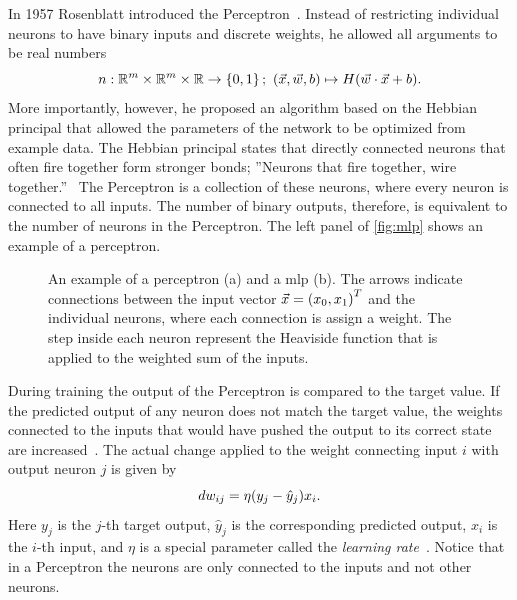 In 1957 Rosenblatt introduced the Perceptron~\cite{rosenblatt:1958}. Instead of restricting individual neurons to have binary inputs and discrete weights, he allowed all arguments to be real numbers
\begin{equation}\label{eq:neuron-rosenblatt}
n: {\mathbb{R}}^m\times {\mathbb{R}}^m\times {\mathbb{R}} \to \left\{0,1\right\};\ {\left( \vec{x}, \vec{w}, b \right)}\mapsto H{\left( \vec{w}\cdot\vec{x} + b \right)}.
\end{equation}
More importantly, however, he proposed an algorithm based on the Hebbian principal that allowed the parameters of the network to be optimized from example data. The Hebbian principal states that directly connected neurons that often fire together form stronger bonds; ''Neurons that fire together, wire together.''~\cite{Geron:2017aaa} The Perceptron is a collection of these neurons, where every neuron is connected to all inputs. The number of binary outputs, therefore, is equivalent to the number of neurons in the Perceptron. The left panel of \autoref{fig:mlp} shows an example of a perceptron. 

\begin{figure}
	\centering
	
	\caption[Perceptron and Multi-Layer Perceptron]{An example of a perceptron (a) and a \acrshort{mlp} (b). The arrows indicate connections between the input vector $\vec{x}={\left( x_0, x_1 \right)}^T$ and the individual neurons, where each connection is assign a weight. The step inside each neuron represent the Heaviside function that is applied to the weighted sum of the inputs.}\label{fig:mlp}
\end{figure}

During training the output of the Perceptron is compared to the target value. If the predicted output of any neuron does not match the target value, the weights connected to the inputs that would have pushed the output to its correct state are increased~\cite{Geron:2017aaa}. The actual change applied to the weight connecting input $i$ with output neuron $j$ is given by
\begin{equation}\label{eq:rosenblatt-gradient}
dw_{ij}=\eta {\left( y_j-\hat{y}_j \right)}x_i.
\end{equation}
Here $y_j$ is the $j$-th target output, $\hat{y}_j$ is the corresponding predicted output, $x_i$ is the $i$-th input, and $\eta$ is a special parameter called the \emph{learning rate}~\cite{Geron:2017aaa}. Notice that in a Perceptron the neurons are only connected to the inputs and not other neurons.

